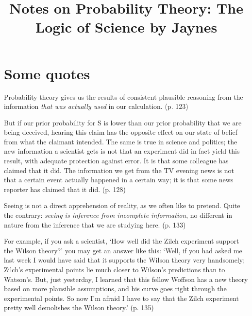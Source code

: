 \documentclass[8pt]{article}
\title{Notes on Probability Theory: The Logic of Science by Jaynes}
\begin{document}
\maketitle
\setcounter{tocdepth}{2} %
\tableofcontents

\pagebreak





















\section{Some quotes}
    \begin{displayquote}
        Probability theory gives us the results of consistent plausible reasoning from the information \textit{that was actually used} in our calculation. (p. 123)
    \end{displayquote}
    
    \begin{displayquote}
        But if our prior probability for S is lower than our prior probability that we are being deceived, hearing this claim has the opposite effect on our state of belief from what the claimant intended. The same is true in science and politics; the new information a scientist gets is not that an experiment did in fact yield this result, with adequate protection against error. It is that some colleague has claimed that it did. The information we get from the TV evening news is not that a certain event actually happened in a certain way; it is that some news reporter has claimed that it did. (p. 128)
    \end{displayquote}

    \begin{displayquote}
        Seeing is not a direct apprehension of reality, as we often like to pretend. Quite the contrary: \textit{seeing is inference from incomplete information}, no different in nature from the inference that we are studying here. (p. 133)
    \end{displayquote}
    
    \begin{displayquote}
        For example, if you ask a scientist, `How well did the Zilch experiment support the Wilson theory?' you may get an answer like this: `Well, if you had asked me last week I would have said that it supports the Wilson theory very handsomely; Zilch's experimental points lie much closer to Wilson’s predictions than to Watson's. But, just yesterday, I learned that this fellow Woffson has a new theory based on more plausible assumptions, and his curve goes right through the experimental points. So now I'm afraid I have to say that the Zilch experiment pretty well demolishes the Wilson theory.' (p. 135)
    \end{displayquote}
\end{document}
